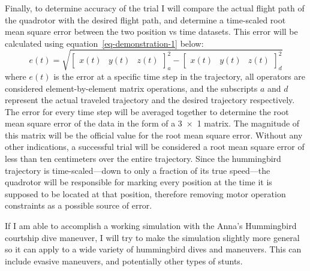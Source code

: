 \documentclass[onecolumn,10pt]{IEEEtran}
\begin{document}
Finally, to determine accuracy of the trial I will compare the actual flight path of the quadrotor with the desired flight path, and determine a time-scaled root mean square error between the two position vs time datasets. This error will be calculated using equation~\ref{eq-demonstration-1} below:
\begin{equation}
e(t) = \sqrt{
\begin{bmatrix}
x(t) & y(t) & z(t)
\end{bmatrix}_a^2 
-
\begin{bmatrix}
x(t) & y(t) & z(t)
\end{bmatrix}_d^2
}
\label{eq-demonstration-1}
\end{equation}
where $e(t)$ is the error at a specific time step in the trajectory, all operators are considered element-by-element matrix operations, and the subscripts $a$ and $d$ represent the actual traveled trajectory and the desired trajectory respectively. The error for every time step will be averaged together to determine the root mean square error of the data in the form of a \num{3x1} matrix. The magnitude of this matrix will be the official value for the root mean square error. Without any other indications, a successful trial will be considered a root mean square error of less than ten centimeters over the entire trajectory. Since the hummingbird trajectory is time-scaled—down to only a fraction of its true speed—the quadrotor will be responsible for marking every position at the time it is supposed to be located at that position, therefore removing motor operation constraints as a possible source of error.

If I am able to accomplish a working simulation with the Anna’s Hummingbird courtship dive maneuver, I will try to make the simulation slightly more general so it can apply to a wide variety of hummingbird dives and maneuvers. This can include evasive maneuvers, and potentially other types of stunts.
\end{document}
